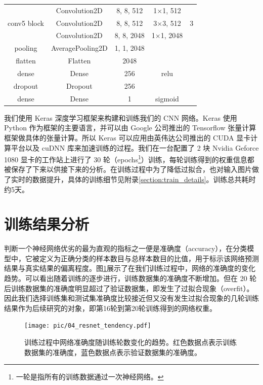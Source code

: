 \begin{table}
\begin{tabular}{ccccc}
  \multirow{3}{*}{conv5 block} &  Convolution2D & 8, 8, 512 & 1$\times$1, 512 & \multirow{3}{*}{3}\\
   & Convolution2D & 8, 8, 512 & 3$\times$3, 512 & \\
   & Convolution2D & 8, 8, 2048 & 1$\times$1, 2048 & \\ \hline
  pooling & AveragePooling2D & 1, 1, 2048 &  & \\ \hline
  flatten & Flatten & 2048 &  & \\ \hline
  dense & Dense & 256 & relu & \\  \hline
  dropout & Dropout & 256 &  & \\   \hline
  dense & Dense & 1 & sigmoid & \\ \hline \hline
    \end{tabular}
    \label{tab:resnet}
  \end{table}

我们使用 Keras\supercite{keras} 深度学习框架来构建和训练我们的 CNN 网络。Keras 使用 Python 作为框架的主要语言，并可以由 Google 公司推出的 Tensorflow\supercite{tensorflow} 张量计算框架做具体的张量计算。所以 Keras 可以应用由英伟达公司推出的 CUDA 显卡计算平台以及 cuDNN\supercite{cudnn} 库来加速训练的过程。我们在一台配置了 2 块 Nvidia Geforce 1080 显卡的工作站上进行了 30 轮（epochs\footnote{一轮是指所有的训练数据通过一次神经网络。}）训练，每轮训练得到的权重信息都被保存了下来以供接下来的分析。在训练过程中为了降低过拟合，也对输入图片做了实时的数据提升，具体的训练细节见附录\ref{section:train_details}。训练总共耗时约5天。
  
\section{训练结果分析}
\label{section:cnn_result}

判断一个神经网络优劣的最为直观的指标之一便是准确度（accuracy），在分类模型中，它被定义为正确分类的样本数目与总样本数目的比值，用于标示该网络预测结果与真实结果的偏离程度。图\ref{fig:train_par}展示了在我们训练过程中，网络的准确度的变化趋势。可以看出随着训练的逐步进行，训练数据集的准确度不断增加。但在 20 轮后训练数据集的准确度明显超过了验证数据集，即发生了过拟合现象（overfit）。因此我们选择训练集和测试集准确度比较接近但又没有发生过拟合现象的几轮训练结果作为后续研究的对象，即第16轮到第20轮训练得到的网络权重。

\begin{figure}
    \centering
    \texttt{[image: pic/04\_resnet\_tendency.pdf]}
    \caption{训练过程中网络准确度随训练轮数变化的趋势。红色数据点表示训练数据集的准确度，蓝色数据点表示验证数据集的准确度。}
    \label{fig:train_par}
\end{figure}

